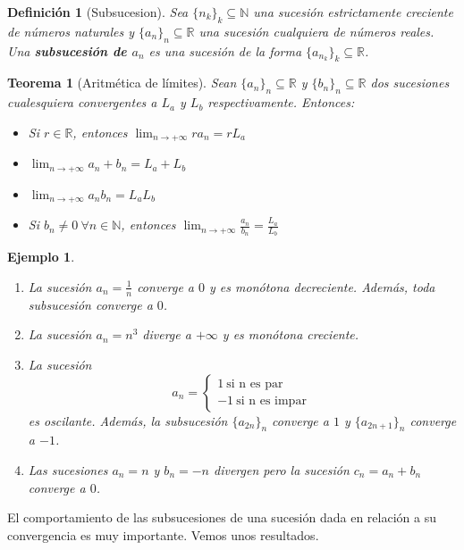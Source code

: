 \documentclass{article}
\newtheorem{theorem}{Teorema}
\newtheorem{define}{Definición}
\newtheorem{ejem}{Ejemplo}
\begin{document}
\begin{define}[Subsucesion]
	Sea $\{ n_k\}_k \subseteq \mathbb{N}$ una sucesión estrictamente creciente de números naturales y $\{ a_n\}_n \subseteq \mathbb{R}$ una sucesión cualquiera de números reales.
	Una \textbf{subsucesión de $a_n$} es una sucesión de la forma $\{ a_{n_k}\}_k \subseteq \mathbb{R}$.
\end{define}

\begin{theorem}[Aritmética de límites]
	Sean $\{ a_n\}_n \subseteq \mathbb{R}$ y $\{ b_n\}_n \subseteq \mathbb{R}$ dos sucesiones cualesquiera convergentes a $L_a$ y $L_b$ respectivamente. Entonces:
	\begin{itemize}
		\item
		Si $r \in \mathbb{R}$, entonces $\lim_{n\rightarrow +\infty} ra_n = rL_a$
		\item
		$\lim_{n\rightarrow +\infty} a_n + b_n = L_a + L_b$
		\item
		$\lim_{n\rightarrow +\infty} a_nb_n = L_aL_b$
		\item
		Si $b_n \neq 0\ \forall n \in \mathbb{N}$, entonces $\lim_{n\rightarrow +\infty} \frac{a_n}{b_n} = \frac{L_a}{L_b}$
	\end{itemize}
\end{theorem}


\begin{ejem}
\begin{enumerate}
\item
La sucesión $a_n = \frac{1}{n}$ converge a $0$ y es monótona decreciente. Además, toda subsucesión converge a $0$.
\item
La sucesión $a_n = n^3$ diverge a $+\infty$ y es monótona creciente.
\item
La sucesión 
\begin{equation}
a_n = \left\lbrace
\begin{array}{l}
1\ \text{si n es par}\\ 
-1\ \text{si n es impar}\
\end{array}
\right.
\end{equation}
es oscilante. Además, la subsucesión $\{a_{2n} \}_n$ converge a $1$ y $\{a_{2n+1} \}_n$ converge a $-1$.
\item
Las sucesiones $a_n = n$ y $b_n = -n$ divergen pero la sucesión $c_n = a_n + b_n$ converge a $0$.
\end{enumerate}
\end{ejem}

El comportamiento de las subsucesiones de una sucesión dada en relación a su convergencia es muy importante. Vemos unos resultados.
\end{document}
